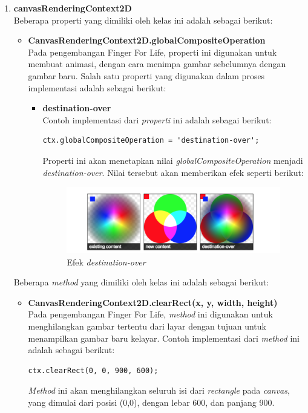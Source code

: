 \begin{enumerate}
\begin{enumerate}
		\item \textbf{canvasRenderingContext2D} \\
		Beberapa properti yang dimiliki oleh kelas ini adalah sebagai berikut:
		\begin{itemize}
			\item \textbf{CanvasRenderingContext2D.globalCompositeOperation} \\
			Pada pengembangan Finger For Life, properti ini digunakan untuk membuat animasi, dengan cara menimpa gambar sebelumnya dengan gambar baru. Salah satu properti yang digunakan dalam proses implementasi adalah sebagai berikut:
			\begin{itemize}
				\item \textbf{destination-over} \\
				Contoh implementasi dari \textit{properti} ini adalah sebagai berikut:
				
\begin{lstlisting}
ctx.globalCompositeOperation = 'destination-over';
\end{lstlisting}
Properti ini akan menetapkan nilai \textit{globalCompositeOperation} menjadi \textit{destination-over}. Nilai tersebut akan memberikan efek seperti berikut:

\begin{figure}[H]
	\centering
	\includegraphics[scale=0.1]{Gambar/canvas_destination}
	\caption{Efek \textit{destination-over}}
	\label{fig:canvas_destination}
\end{figure}
			\end{itemize}
		\end{itemize}
		
		Beberapa \textit{method} yang dimiliki oleh kelas ini adalah sebagai berikut:
		\begin{itemize}
			\item \textbf{CanvasRenderingContext2D.clearRect(x, y, width, height)} \\
			Pada pengembangan Finger For Life, \textit{method} ini digunakan untuk menghilangkan gambar tertentu dari layar dengan tujuan untuk menampilkan gambar baru kelayar. Contoh implementasi dari \textit{method} ini adalah sebagai berikut:
\begin{lstlisting}
ctx.clearRect(0, 0, 900, 600);
\end{lstlisting}
\textit{Method} ini akan menghilangkan seluruh isi dari \textit{rectangle} pada \textit{canvas}, yang dimulai dari posisi (0,0), dengan lebar 600, dan panjang 900.			
			

\end{itemize}
\end{enumerate}
\end{enumerate}
